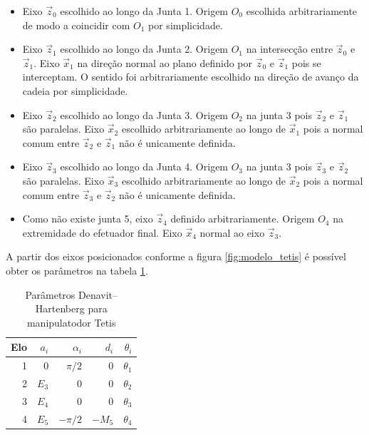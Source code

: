 \begin{itemize}
\item Eixo $\vec{z}_0$ escolhido ao longo da Junta 1. Origem $O_0$ escolhida arbitrariamente de modo a coincidir com $O_1$ por simplicidade.  
\item Eixo $\vec{z}_1$ escolhido ao longo da Junta 2. Origem $O_1$ na intersecção entre $\vec{z}_0$ e $\vec{z}_1$. Eixo $\vec{x}_1$ na direção normal ao plano definido por $\vec{z}_0$ e $\vec{z}_1$ pois se interceptam. O sentido foi arbitrariamente escolhido na direção de avanço da cadeia por simplicidade.
\item Eixo $\vec{z}_2$ escolhido ao longo da Junta 3. Origem $O_2$ na junta 3 pois $\vec{z}_2$ e $\vec{z}_1$ são paralelas. Eixo $\vec{x}_2$ escolhido arbitrariamente ao longo de $\vec{x}_1$ pois a normal comum entre $\vec{z}_2$ e $\vec{z}_1$ não é unicamente definida.
\item Eixo $\vec{z}_3$ escolhido ao longo da Junta 4. Origem $O_3$ na junta 3 pois $\vec{z}_3$ e $\vec{z}_2$ são paralelas. Eixo $\vec{x}_3$ escolhido arbitrariamente ao longo de  $\vec{x}_2$ pois a normal comum entre $\vec{z}_3$ e $\vec{z}_2$ não é unicamente definida.
\item Como não existe junta 5, eixo $\vec{z}_4$ definido arbitrariamente. Origem $O_4$ na extremidade do efetuador final. Eixo $\vec{x}_4$ normal ao eixo $\vec{z}_3$.
\end{itemize}

A partir dos eixos posicionados conforme a figura \ref{fig:modelo_tetis} é possível obter os parâmetros na tabela \ref{tab:dh_tetis}. 


\begin{table}[h!]
\centering
\caption{Parâmetros Denavit–Hartenberg para manipulatodor Tetis}
\label{tab:dh_tetis}
\begin{tabular}{rrrrr} \hline
Elo & $a_i$ & $\alpha_i$ & $d_i$  & $\theta_i$ \\ \hline
1   & 0     & $\pi/2$    & 0      & $\theta_1$ \\
2   & $E_3$ & 0          & 0      & $\theta_2$ \\
3   & $E_4$ & 0          & 0      & $\theta_3$ \\
4   & $E_5$ & $-\pi/2$   & $-M_5$ & $\theta_4$ \\ \hline
\end{tabular}
\end{table}


